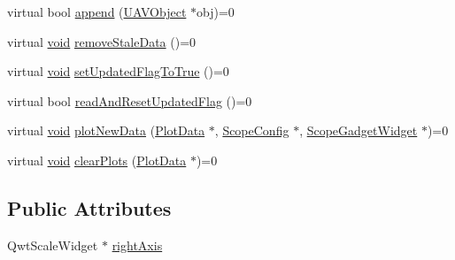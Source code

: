 \begin{DoxyCompactItemize}
\item 
virtual bool \hyperlink{group___scope_plugin_ga5b3222f1966c12cc3dbbfe79f80f49e8}{append} (\hyperlink{class_u_a_v_object}{\-U\-A\-V\-Object} $\ast$obj)=0
\item 
virtual \hyperlink{group___u_a_v_objects_plugin_ga444cf2ff3f0ecbe028adce838d373f5c}{void} \hyperlink{group___scope_plugin_gaa72c7c3b2933a5f313be52020c003990}{remove\-Stale\-Data} ()=0
\item 
virtual \hyperlink{group___u_a_v_objects_plugin_ga444cf2ff3f0ecbe028adce838d373f5c}{void} \hyperlink{group___scope_plugin_ga9c8859638969e941f2e71d57b9454c37}{set\-Updated\-Flag\-To\-True} ()=0
\item 
virtual bool \hyperlink{group___scope_plugin_ga18a9ab6db2aa09b675a0ede1e0bfddc6}{read\-And\-Reset\-Updated\-Flag} ()=0
\item 
virtual \hyperlink{group___u_a_v_objects_plugin_ga444cf2ff3f0ecbe028adce838d373f5c}{void} \hyperlink{group___scope_plugin_ga804704f7eaf4186938e8d1163a9d410c}{plot\-New\-Data} (\hyperlink{class_plot_data}{\-Plot\-Data} $\ast$, \hyperlink{class_scope_config}{\-Scope\-Config} $\ast$, \hyperlink{class_scope_gadget_widget}{\-Scope\-Gadget\-Widget} $\ast$)=0
\item 
virtual \hyperlink{group___u_a_v_objects_plugin_ga444cf2ff3f0ecbe028adce838d373f5c}{void} \hyperlink{group___scope_plugin_ga69868354ebe2ca7e39c8663d547c5935}{clear\-Plots} (\hyperlink{class_plot_data}{\-Plot\-Data} $\ast$)=0
\end{DoxyCompactItemize}
\subsection*{\-Public \-Attributes}
\begin{DoxyCompactItemize}
\item 
\-Qwt\-Scale\-Widget $\ast$ \hyperlink{group___scope_plugin_gad0b4661f32046ccf0ab49100be76c1b3}{right\-Axis}
\end{DoxyCompactItemize}
